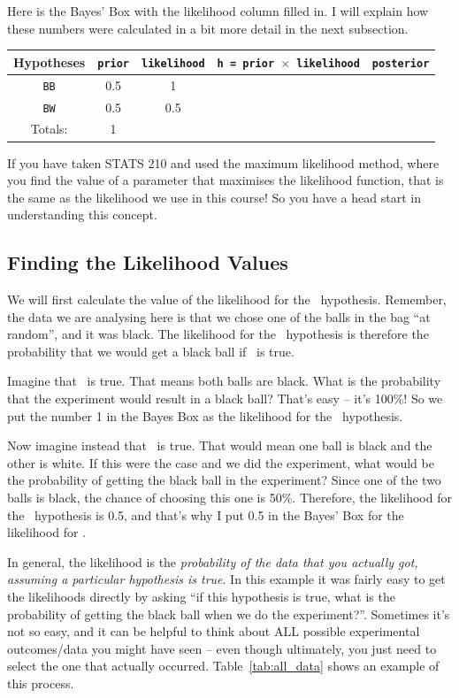 Here is the Bayes' Box with the likelihood column filled in. I will explain
how these numbers were calculated in a bit more detail in the next subsection.
\begin{table}[ht!]
\begin{center}
\begin{tabular}{|c|c|c|c|c|}
\hline
{\bf Hypotheses} & {\tt prior} & {\tt likelihood} &
{\tt h = prior $\times$ likelihood} & {\tt posterior}\\
\hline
{\tt BB} & 0.5 & 1 &  & \\
{\tt BW} & 0.5 & 0.5 &  & \\
\hline
Totals: & 1 & & & \\
\hline
\end{tabular}
\end{center}
\end{table}
If you have taken STATS 210 and used the maximum likelihood method, where you
find the value of a parameter that maximises the likelihood function, that is
the same as the likelihood we use in this course! So you have a head start
in understanding this concept.

\subsection{Finding the Likelihood Values}
We will first calculate the value of the likelihood for the \bb~hypothesis.
Remember, the data we are analysing here is that we chose one of the balls in
the bag ``at random'', and it was black. The likelihood for the \bb~hypothesis is
therefore the probability that we would get a black ball if \bb~is true.

Imagine that \bb~is true. That means both balls are black. What is the probability that
the experiment would result in a black ball? That's easy -- it's 100\%! So we
put the number 1 in the Bayes Box as the likelihood for the \bb~hypothesis.

Now imagine instead that \bw~is true. That would mean one ball is black and the
other is white. If this were the case and we did the experiment, what would be
the probability of getting the black ball in the experiment? Since one of the
two balls is black, the chance of choosing this one is 50\%. Therefore, the
likelihood for the \bw~hypothesis is 0.5, and that's why I put 0.5 in the Bayes'
Box for the likelihood for \bw.

In general, the likelihood is the {\it probability of the data that you actually
got, assuming a particular hypothesis is true}. In this example it was
fairly easy to get the likelihoods directly by asking ``if this hypothesis
is true, what is the probability of getting the black ball when we do the
experiment?''. Sometimes it's not so easy, and it can be helpful to think about
ALL possible experimental outcomes/data you might have seen -- even though
ultimately, you just need to select the one that actually occurred.
Table~\ref{tab:all_data} shows an example of this process.

